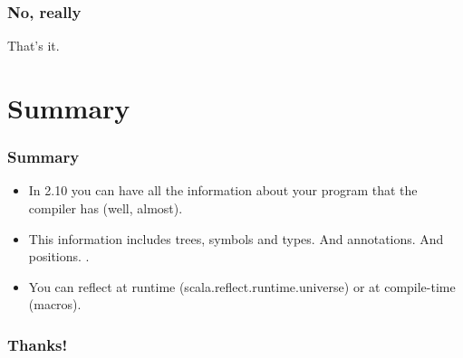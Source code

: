 \documentclass[hyperref={bookmarks=false}]{beamer}
\begin{document}
\begin{frame}[fragile]
\frametitle{No, really}

That's it.

\end{frame}

\section{Summary}

\begin{frame}[fragile]
\frametitle{Summary}

\begin{itemize}
\item In 2.10 you can have all the information about your program that the compiler has (well, almost).
\item This information includes trees, symbols and types. And annotations. And positions.
.
\item You can reflect at runtime (scala.reflect.runtime.universe) or at compile-time (macros).
\end{itemize}
\end{frame}


\begin{frame}[fragile]
\frametitle{Thanks!}

\centering
{}

\end{frame}
\end{document}
